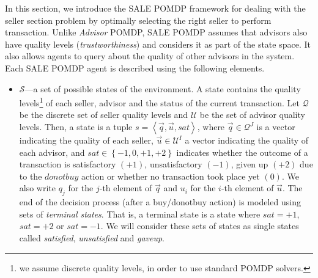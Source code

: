 \documentclass{aamas2013}
\providecommand{\SALEP}{SALE POMDP}
\begin{document}
In this section, we introduce the \SALEP{} framework for dealing with the seller section problem by optimally selecting the right seller to perform transaction. Unlike \textit{Advisor} POMDP, \SALEP{} assumes that advisors also have quality levels (\emph{trustworthiness}) and considers it as part of the state space. It also allows agents to query about the quality of other advisors in the system. Each \SALEP{} agent is described using the following elements.
\begin{itemize}
\item $\mathcal{S}$---a set of possible states of the environment. A state contains the quality levels\footnote{we assume discrete quality levels, in order to use standard POMDP solvers.} of each seller, advisor and the status of the current transaction. Let $\mathcal{Q}$ be the discrete set of seller quality levels and $\mathcal{U}$ be the set of advisor quality levels. Then, a state is a tuple $s=\left\langle \vec{q},\vec{u},sat\right\rangle $, where $\vec{q}\in\mathcal{Q}^{J}$ is a vector indicating the quality of each seller, $\vec{u}\in\mathcal{U}^{I}$ a vector indicating the quality of each advisor, and $sat\in\left\{ -1,0,+1,+2\right\} $ indicates whether the outcome of a transaction is satisfactory $(+1)$, unsatisfactory $(-1)$, given up $(+2)$ due to the $donotbuy$ action or whether no transaction took place yet $(0)$. We also write $q_{j}$ for the $j$-th element of $\vec{q}$ and $u_{i}$ for the $i$-th element of $\vec{u}$. The end of the decision process (after a buy/donotbuy action) is modeled using sets of \textit{terminal states}. That is, a terminal state is a state where $sat=+1$, $sat=+2$ or $sat=-1$. We will consider these sets of states as single states called \textit{satisfied}, \textit{unsatisfied} and \textit{gaveup}.


\end{itemize}
\end{document}
